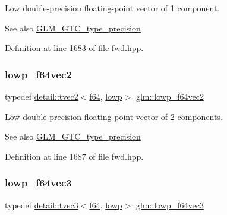 Low double-\/precision floating-\/point vector of 1 component. \begin{DoxySeeAlso}{See also}
\hyperlink{group__gtc__type__precision}{G\+L\+M\+\_\+\+G\+T\+C\+\_\+type\+\_\+precision} 
\end{DoxySeeAlso}


Definition at line 1683 of file fwd.\+hpp.

\mbox{\label{group__gtc__type__precision_gaf2c6cba98bb2c2f1560d8edff4b70938}} 
\subsubsection{\texorpdfstring{lowp\+\_\+f64vec2}{lowp\_f64vec2}}
{\footnotesize\ttfamily typedef \hyperlink{structglm_1_1detail_1_1tvec2}{detail\+::tvec2}$<$\hyperlink{group__gtc__type__precision_ga2bba392e555124b36cde6abba349bab3}{f64}, \hyperlink{namespaceglm_a0f04f086094c747d227af4425893f545ae161af3fc695e696ce3bf69f7332bc2d}{lowp}$>$ \hyperlink{group__gtc__type__precision_gaf2c6cba98bb2c2f1560d8edff4b70938}{glm\+::lowp\+\_\+f64vec2}}

Low double-\/precision floating-\/point vector of 2 components. \begin{DoxySeeAlso}{See also}
\hyperlink{group__gtc__type__precision}{G\+L\+M\+\_\+\+G\+T\+C\+\_\+type\+\_\+precision} 
\end{DoxySeeAlso}


Definition at line 1687 of file fwd.\+hpp.

\mbox{\label{group__gtc__type__precision_gad2d5e1436d926ae7201c860dce01a0fe}} 
\subsubsection{\texorpdfstring{lowp\+\_\+f64vec3}{lowp\_f64vec3}}
{\footnotesize\ttfamily typedef \hyperlink{structglm_1_1detail_1_1tvec3}{detail\+::tvec3}$<$\hyperlink{group__gtc__type__precision_ga2bba392e555124b36cde6abba349bab3}{f64}, \hyperlink{namespaceglm_a0f04f086094c747d227af4425893f545ae161af3fc695e696ce3bf69f7332bc2d}{lowp}$>$ \hyperlink{group__gtc__type__precision_gad2d5e1436d926ae7201c860dce01a0fe}{glm\+::lowp\+\_\+f64vec3}}

